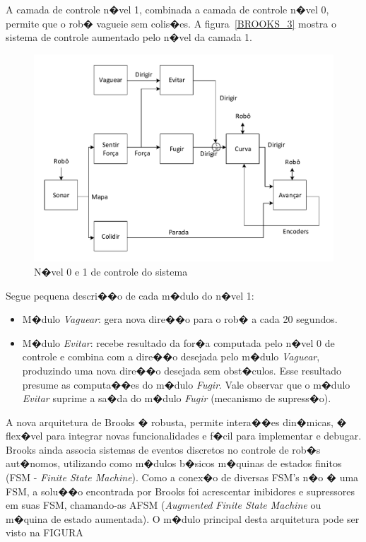  A camada de controle n�vel 1, combinada a camada de controle n�vel 0, permite
 que o rob� vagueie sem colis�es. A figura~\ref{BROOKS_3} mostra o sistema de
 controle aumentado pelo n�vel da camada 1.

\begin{figure}[H]
\centering
\includegraphics[width=1\columnwidth]{figs/BROOKS_4.pdf}
\caption{N�vel 0 e 1 de controle do sistema}
\label{BROOKS_4}
\end{figure}

Segue pequena descri��o de cada m�dulo do n�vel 1:
\begin{itemize}
  \item M�dulo \emph{Vaguear}: gera nova dire��o para o rob� a cada 20 segundos.
  \item M�dulo \emph{Evitar}: recebe resultado da for�a computada pelo n�vel 0
  de controle e combina com a dire��o desejada pelo m�dulo \emph{Vaguear},
  produzindo uma nova dire��o desejada sem obst�culos. Esse resultado presume as
  computa��es do m�dulo \emph{Fugir}. Vale observar que o m�dulo \emph{Evitar}
  suprime a sa�da do m�dulo \emph{Fugir} (mecanismo de supress�o). 
\end{itemize}

A nova arquitetura de Brooks � robusta, permite intera��es din�micas, � flex�vel
para integrar novas funcionalidades e f�cil para implementar e debugar. Brooks
ainda associa sistemas de eventos discretos no controle de rob�s aut�nomos,
utilizando como m�dulos b�sicos m�quinas de estados finitos (FSM - \emph{Finite
State Machine}). Como a conex�o de diversas FSM's n�o � uma FSM, a solu��o
encontrada por Brooks foi acrescentar inibidores e supressores em suas
FSM, chamando-as AFSM (\emph{Augmented Finite State Machine} ou m�quina de
estado aumentada). O m�dulo principal desta arquitetura pode ser visto na FIGURA



